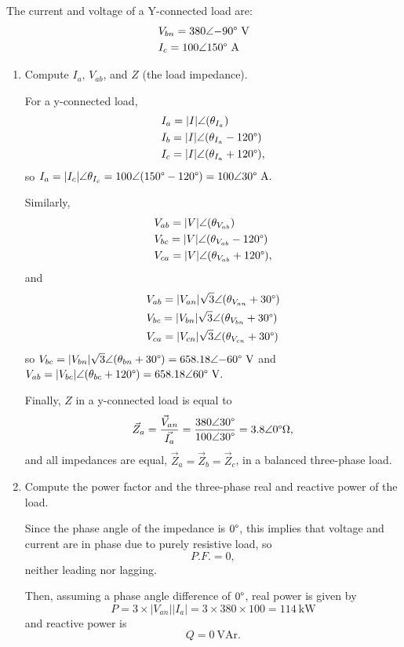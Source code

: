\documentclass{article}
\begin{document}
\subsection{} The current and voltage of a Y-connected load are: \begin{align*}
	&V_{bn} = 380 \angle{-90\degree} \ \mathrm{V}\\
	&I_{c} = 100 \angle{150\degree} \ \mathrm{A}
\end{align*}
\begin{enumerate}[label=\alph*)]
	\item Compute \(I_a\), \(V_{ab}\), and \(Z\) (the load impedance).
   
  For a y-connected load, 
	\begin{align*}
		&I_{a} = |I|\angle({\theta_{I_{a}}}) \\
		&I_{b} = |I|\angle({\theta_{I_{a}} - 120\degree}) \\
		&I_{c} = |I|\angle({\theta_{I_{a}} + 120\degree}), 
	\end{align*} so \(I_{a} = |I_{c}|\angle{\theta_{I_c}} = 100\angle{(150\degree - 120\degree)} = 100\angle{30\degree} \ \mathrm{A}.\)

	Similarly, 
	\begin{align*}
	  &V_{ab} = |V|\angle{(\theta_{V_{ab}}}) \\ 
	  &V_{bc} = |V|\angle{(\theta_{V_{ab}} - 120\degree}) \\ 
	  &V_{ca} = |V|\angle{(\theta_{V_{ab}} + 120\degree}), 
	\end{align*} and 
	\begin{align*}
	 &V_{ab} = |V_{an}|\sqrt{3}\angle{(\theta_{V_{an}}+30\degree)} \\
	 &V_{bc} = |V_{bn}|\sqrt{3}\angle{(\theta_{V_{bn}}+30\degree)} \\
	 &V_{ca} = |V_{cn}|\sqrt{3}\angle{(\theta_{V_{cn}}+30\degree)} \\
	\end{align*} so \(V_{bc} = |V_{bn}|\sqrt{3}\angle{(\theta_{bn}+30\degree) = 658.18\angle{-60\degree}} \ \mathrm{V}\) and \(V_{ab} = |V_{bc}|\angle{(\theta_{bc}}+120\degree) = 658.18\angle{60\degree} \ \mathrm{V}.\)

	Finally, \(Z\) in a y-connected load is equal to 
	\[
		\vec{Z}_a = \frac{\vec{V}_{an}}{\vec{I_{a}}} = \frac{380\angle{30\degree}}{100\angle{30\degree}} = 3.8\angle{0\degree\ohm},
	\]
	and all impedances are equal, \(\vec{Z}_a = \vec{Z}_b = \vec{Z}_c\), in a balanced three-phase load.
	\item Compute the power factor and the three-phase real and reactive power of the load.

		Since the phase angle of the impedance is \(0\degree\), this implies that voltage and current are in phase due to purely resistive load, so \[
		  P.F. = 0,
		\]
		neither leading nor lagging.

		Then, assuming a phase angle difference of \(0\degree\), real power is given by \[
			P = 3 \times |V_{an}||I_{a}| = 3 \times 380 \times 100 = 114 \ \mathrm{kW}
		\]
		and reactive power is \[
			Q = 0 \ \mathrm{VAr}.
		\]
\end{enumerate}
\end{document}
